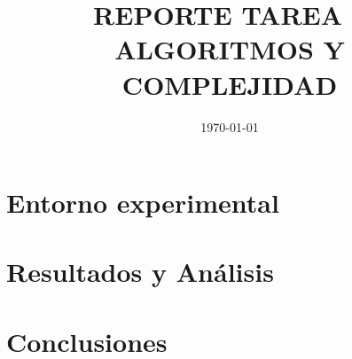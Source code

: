 \documentclass[11pt,spanish]{article} %
\author{\namestudent}
\title{
  \huge
  \textbf{REPORTE TAREA \tnum~ \\ ALGORITMOS Y COMPLEJIDAD} \\[1ex]
  \emph{\textquote{¿Quien ganará? Greedys vs Dinámico vs Bruto.}}
  }
\date{
  \small
  \today\\
}
\begin{document}
\maketitle
\thispagestyle{fancy}
\vspace{-1.0\baselineskip}

\section{Entorno experimental}


\section{Resultados y Análisis}


\section{Conclusiones}


\printbibliography
\end{document}
